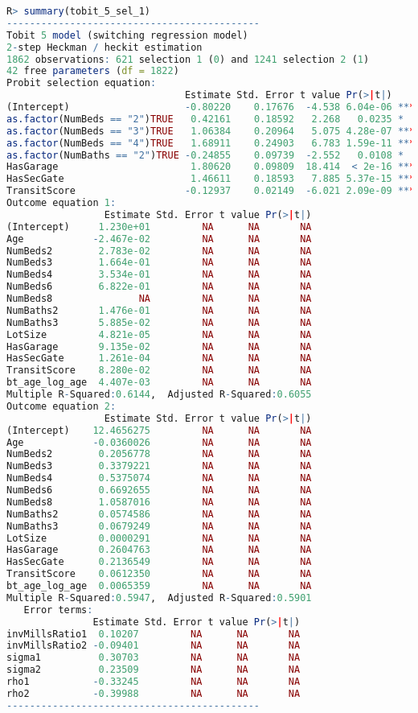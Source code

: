 \begin{lstlisting}[language=R]
R> summary(tobit_5_sel_1)
--------------------------------------------
Tobit 5 model (switching regression model)
2-step Heckman / heckit estimation
1862 observations: 621 selection 1 (0) and 1241 selection 2 (1)
42 free parameters (df = 1822)
Probit selection equation:
                               Estimate Std. Error t value Pr(>|t|)    
(Intercept)                    -0.80220    0.17676  -4.538 6.04e-06 ***
as.factor(NumBeds == "2")TRUE   0.42161    0.18592   2.268   0.0235 *  
as.factor(NumBeds == "3")TRUE   1.06384    0.20964   5.075 4.28e-07 ***
as.factor(NumBeds == "4")TRUE   1.68911    0.24903   6.783 1.59e-11 ***
as.factor(NumBaths == "2")TRUE -0.24855    0.09739  -2.552   0.0108 *  
HasGarage                       1.80620    0.09809  18.414  < 2e-16 ***
HasSecGate                      1.46611    0.18593   7.885 5.37e-15 ***
TransitScore                   -0.12937    0.02149  -6.021 2.09e-09 ***
Outcome equation 1:
                 Estimate Std. Error t value Pr(>|t|)
(Intercept)     1.230e+01         NA      NA       NA
Age            -2.467e-02         NA      NA       NA
NumBeds2        2.783e-02         NA      NA       NA
NumBeds3        1.664e-01         NA      NA       NA
NumBeds4        3.534e-01         NA      NA       NA
NumBeds6        6.822e-01         NA      NA       NA
NumBeds8               NA         NA      NA       NA
NumBaths2       1.476e-01         NA      NA       NA
NumBaths3       5.885e-02         NA      NA       NA
LotSize         4.821e-05         NA      NA       NA
HasGarage       9.135e-02         NA      NA       NA
HasSecGate      1.261e-04         NA      NA       NA
TransitScore    8.280e-02         NA      NA       NA
bt_age_log_age  4.407e-03         NA      NA       NA
Multiple R-Squared:0.6144,	Adjusted R-Squared:0.6055
Outcome equation 2:
                 Estimate Std. Error t value Pr(>|t|)
(Intercept)    12.4656275         NA      NA       NA
Age            -0.0360026         NA      NA       NA
NumBeds2        0.2056778         NA      NA       NA
NumBeds3        0.3379221         NA      NA       NA
NumBeds4        0.5375074         NA      NA       NA
NumBeds6        0.6692655         NA      NA       NA
NumBeds8        1.0587016         NA      NA       NA
NumBaths2       0.0574586         NA      NA       NA
NumBaths3       0.0679249         NA      NA       NA
LotSize         0.0000291         NA      NA       NA
HasGarage       0.2604763         NA      NA       NA
HasSecGate      0.2136549         NA      NA       NA
TransitScore    0.0612350         NA      NA       NA
bt_age_log_age  0.0065359         NA      NA       NA
Multiple R-Squared:0.5947,	Adjusted R-Squared:0.5901
   Error terms:
               Estimate Std. Error t value Pr(>|t|)
invMillsRatio1  0.10207         NA      NA       NA
invMillsRatio2 -0.09401         NA      NA       NA
sigma1          0.30703         NA      NA       NA
sigma2          0.23509         NA      NA       NA
rho1           -0.33245         NA      NA       NA
rho2           -0.39988         NA      NA       NA
--------------------------------------------
\end{lstlisting}

